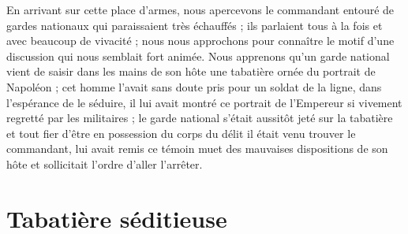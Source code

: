 \documentclass[11pt,a4paper]{report}
\begin{document}
En arrivant sur cette place d'armes, nous apercevons le commandant entouré de gardes nationaux qui paraissaient très échauffés ; ils parlaient tous à la fois et avec beaucoup de vivacité ; nous nous approchons pour connaître le motif d'une discussion qui nous semblait fort animée. Nous apprenons qu'un garde national vient de saisir dans les mains de son hôte une tabatière ornée du portrait de Napoléon ; cet homme l'avait sans doute pris pour un soldat de la ligne, dans l'espérance de le séduire, il lui avait montré ce portrait de l'Empereur si vivement regretté par les militaires ; le garde national s'était aussitôt jeté sur la tabatière et tout fier d'être en possession du corps du délit il était venu trouver le commandant, lui avait remis ce témoin muet des mauvaises dispositions de son hôte et sollicitait l'ordre d'aller l'arrêter.

\section*{Tabatière séditieuse}
\end{document}
